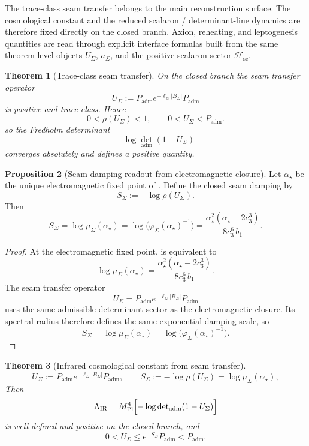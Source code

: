 \documentclass[11pt,a4paper]{article}
\newtheorem{theorem}{Theorem}[section]
\theoremstyle{definition}
\newtheorem{proposition}[theorem]{Proposition}
\theoremstyle{remark}
\newcommand{\Seam}{\Sigma}
\newcommand{\Mplunred}{M_{\mathrm{Pl}}}
\newcommand{\cthree}{c_3}
\newcommand{\phiseam}{\varphi_{\Sigma}}
\newcommand{\Padm}{P_{\mathrm{adm}}}
\begin{document}
The trace-class seam transfer belongs to the main reconstruction surface. The cosmological
constant and the reduced scalaron / determinant-line dynamics are therefore fixed directly on the
closed branch. Axion, reheating, and leptogenesis quantities are read through explicit interface
formulas built from the same theorem-level objects $U_\Sigma$, $a_\Sigma$, and the positive
scalaron sector $\mathcal H_{\mathrm{sc}}$.

\begin{theorem}[Trace-class seam transfer]
\label{lem:automatic-seam-transfer-convergence}
On the closed branch the seam transfer operator
\[
U_\Sigma:=\Padm e^{-\ell_\Seam|B_\Seam|}\Padm
\]
is positive and trace class. Hence
\[
0<\rho(U_\Sigma)<1,
\qquad
0<U_\Sigma<\Padm.
\]
so the Fredholm determinant
\[
-\log\det_{\mathrm{adm}}(1-U_\Sigma)
\]
converges absolutely and defines a positive quantity.
\end{theorem}

\begin{proposition}[Seam damping readout from electromagnetic closure]
\label{prop:seam-action-cosmology}
Let $\alpha_\star$ be the unique electromagnetic fixed point of
. Define the closed seam damping by
\[
S_\Sigma:=-\log\rho(U_\Sigma).
\]
Then
\[
S_\Sigma
=
\log\mu_\Sigma(\alpha_\star)
=
\log\!\bigl(\phiseam(\alpha_\star)^{-1}\bigr)
=
\frac{\alpha_\star^2(\alpha_\star-2\cthree^3)}{8\cthree^6\,b_1}.
\]
\end{proposition}

\begin{proof}
At the electromagnetic fixed point,  is equivalent to
\[
\log\mu_\Sigma(\alpha_\star)
=
\frac{\alpha_\star^2(\alpha_\star-2\cthree^3)}{8\cthree^6\,b_1}.
\]
The seam transfer operator
\[
U_\Sigma=\Padm e^{-\ell_\Seam|B_\Seam|}\Padm
\]
uses the same admissible determinant sector as the electromagnetic closure. Its spectral radius
therefore defines the same exponential damping scale, so
\[
S_\Sigma
=
\log\mu_\Sigma(\alpha_\star)
=
\log\!\bigl(\phiseam(\alpha_\star)^{-1}\bigr).
\]
\end{proof}

\begin{theorem}[Infrared cosmological constant from seam transfer]
\label{thm:cosmology-closure}
\[
U_\Sigma:=\Padm e^{-\ell_\Seam |B_\Seam|}\Padm,
\qquad
S_\Sigma:=-\log\rho(U_\Sigma)=\log\mu_\Sigma(\alpha_\star),
\]
Then
\[
\Lambda_{\mathrm{IR}}
=
\Mplunred^4
\Bigl[-\log\det\nolimits_{\mathrm{adm}}(1-U_\Sigma)\Bigr]
\]
is well defined and positive on the closed branch, and
\[
0<U_\Sigma\le e^{-S_\Sigma}\Padm<\Padm.
\]
\end{theorem}
\end{document}
